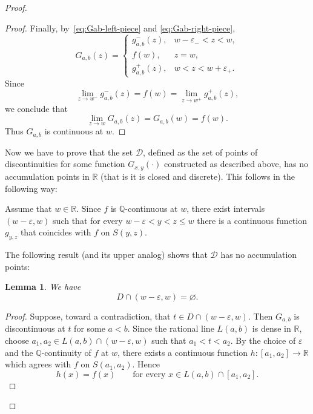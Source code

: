 \documentclass[11pt]{amsart} %
\newtheorem{lemma}[theorem]{Lemma}
\theoremstyle{definition}
\newcommand{\R}{\mathbb{R}}
\newcommand{\Q}{\mathbb{Q}}
\begin{document}
\begin{proof}
\begin{proof}
Finally, by~\eqref{eq:Gab-left-piece} and
\eqref{eq:Gab-right-piece},
\begin{equation} 
G_{a,b}(z)=
\begin{cases}
g^-_{a,b}(z), & w-\varepsilon_-<z<w,\\
f(w),         & z=w,\\
g^+_{a,b}(z), & w<z<w+\varepsilon_+.
\end{cases}
\end{equation} 
Since
\begin{equation} 
\lim_{z\to w^-}g^-_{a,b}(z)
=
f(w)
=
\lim_{z\to w^+}g^+_{a,b}(z),
\end{equation} 
we conclude that
\begin{equation} 
\lim_{z\to w}G_{a,b}(z)=G_{a,b}(w)=f(w).
\end{equation} 
Thus $G_{a,b}$ is continuous at $w$.
\end{proof}



Now we have to prove that the set $\mathcal{D}$,  defined as the set of points of discontinuities for some function $G_{x,y}(\cdot)$ constructed as described above, has no accumulation points in $\R$ (that is it is closed and discrete). This follows in the
following way: 

Assume that $w\in \R$. Since $f$ is $\Q$-continuous at $w$, there exist intervals $(w-\varepsilon,w)$ 
such that for every $w-\varepsilon < y<z\leq w$ there is a continuous function $g_{y,z}$ that coincides with $f$ on $S(y,z)$.  

The following result (and its upper analog) shows that 
$\mathcal{D}$ has no accumulation points: 

\begin{lemma}\label{lem:D-no-left-accumulation}
We have
\begin{equation} 
D\cap (w-\varepsilon,w)=\varnothing.
\end{equation} 
\end{lemma}

\begin{proof}
Suppose, toward a contradiction, that
$t\in D\cap(w-\varepsilon,w).$
Then $G_{a,b}$ is discontinuous at $t$ for some $a<b$. Since the rational line $L(a,b)$ is dense in $\mathbb R$, choose $
a_1,a_2\in L(a,b)\cap(w-\varepsilon,w)$ 
such that $a_1<t<a_2.$ 
By the choice of $\varepsilon$ and the $\mathbb Q$-continuity of
$f$ at $w$, there exists a continuous function
$h\colon [a_1,a_2]\longrightarrow\mathbb R$ 
which agrees with $f$ on $S(a_1,a_2)$.
Hence
\begin{equation} 
h(x)=f(x)
\qquad
\text{for every }x\in L(a,b)\cap[a_1,a_2].
\end{equation} 


\end{proof}
\end{proof}
\end{document}
